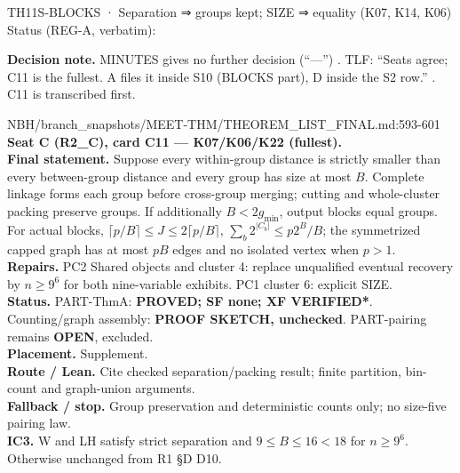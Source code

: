\begin{card}{TH11}{S-BLOCKS · Separation ⇒ groups kept; SIZE ⇒ equality (K07, K14, K06)}
\approvedFB\quad Status (REG-A, verbatim):  

\textbf{Decision note.} MINUTES gives no further decision (``—'') . TLF: ``Seats agree; C11 is the fullest. A files it inside S10 (BLOCKS part), D inside the S2 row.'' . C11 is transcribed first.

\begin{stmt}{NBH/branch_snapshots/MEET-THM/THEOREM_LIST_FINAL.md:593-601}
\textbf{Seat C (R2\_C), card C11 — K07/K06/K22 (fullest).}\\
\textbf{Final statement.} Suppose every within-group distance is strictly smaller than every between-group distance and every group has size at most $B$. Complete linkage forms each group before cross-group merging; cutting and whole-cluster packing preserve groups. If additionally $B<2g_{\min}$, output blocks equal groups. For actual blocks, $\lceil p/B\rceil\le J\le2\lceil p/B\rceil$, $\sum_b2^{\lvert C_b\rvert}\le p2^B/B$; the symmetrized capped graph has at most $pB$ edges and no isolated vertex when $p>1$.\\
\textbf{Repairs.} PC2 Shared objects and cluster 4: replace unqualified eventual recovery by $n\ge9^6$ for both nine-variable exhibits. PC1 cluster 6: explicit SIZE.\\
\textbf{Status.} PART-ThmA: \textbf{PROVED; SF none; XF VERIFIED*}. Counting/graph assembly: \textbf{PROOF SKETCH, unchecked}. PART-pairing remains \textbf{OPEN}, excluded.\\
\textbf{Placement.} Supplement.\\
\textbf{Route / Lean.} Cite checked separation/packing result; finite partition, bin-count and graph-union arguments.\\
\textbf{Fallback / stop.} Group preservation and deterministic counts only; no size-five pairing law.\\
\textbf{IC3.} W and LH satisfy strict separation and $9\le B\le16<18$ for $n\ge9^6$. Otherwise unchanged from R1 §D D10.
\end{stmt}


\end{card}
